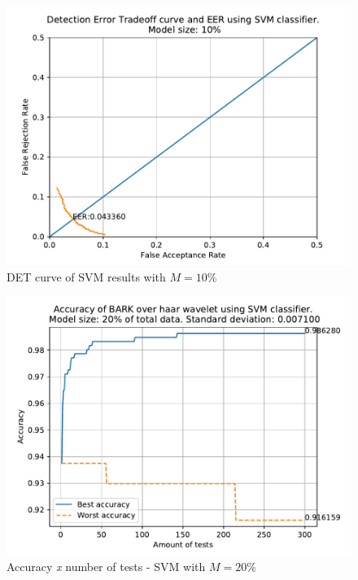 	\begin{figure}[H]
		\centering
		\includegraphics[scale=.8]{images/results/det/DET_for_classifier_SVM_10.pdf}
		\caption{DET curve of SVM results with $M=10\%$}
		\label{fig:detsvm10}
	\end{figure}
	\begin{figure}[H]
		\centering
		\includegraphics[scale=.8]{images/results/confusionMatrices/classifier_SVM_20.pdf}
		\caption{Accuracy \textit{x} number of tests - SVM with $M=20\%$}
		\label{fig:classifiersvm20}
	\end{figure}
